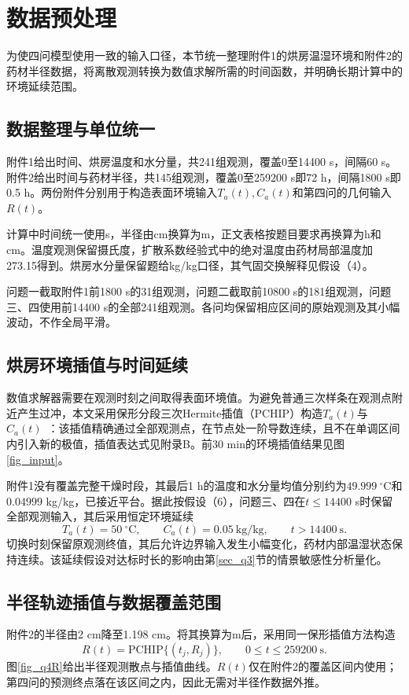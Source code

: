 \section{数据预处理}\label{sec_preprocessing}
为使四问模型使用一致的输入口径，本节统一整理附件1的烘房温湿环境和附件2的药材半径数据，将离散观测转换为数值求解所需的时间函数，并明确长期计算中的环境延续范围。

\subsection{数据整理与单位统一}
附件1给出时间、烘房温度和水分量，共241组观测，覆盖0至14400 s，间隔60 s。附件2给出时间与药材半径，共145组观测，覆盖0至259200 s即72 h，间隔1800 s即0.5 h。两份附件分别用于构造表面环境输入$T_a(t),C_a(t)$和第四问的几何输入$R(t)$。

计算中时间统一使用s，半径由cm换算为m，正文表格按题目要求再换算为h和cm。温度观测保留摄氏度，扩散系数经验式中的绝对温度由药材局部温度加273.15得到。烘房水分量保留题给kg/kg口径，其气固交换解释见假设（4）。

问题一截取附件1前1800 s的31组观测，问题二截取前10800 s的181组观测，问题三、四使用前14400 s的全部241组观测。各问均保留相应区间的原始观测及其小幅波动，不作全局平滑。

\subsection{烘房环境插值与时间延续}
数值求解器需要在观测时刻之间取得表面环境值。为避免普通三次样条在观测点附近产生过冲，本文采用保形分段三次Hermite插值（PCHIP）构造$T_a(t)$与$C_a(t)$~\cite{pchip}：该插值精确通过全部观测点，在节点处一阶导数连续，且不在单调区间内引入新的极值，插值表达式见附录B。前30 min的环境插值结果见图\ref{fig_input}。

附件1没有覆盖完整干燥时段，其最后1 h的温度和水分量均值分别约为$49.999\ ^\circ\mathrm C$和$0.04999$ kg/kg，已接近平台。据此按假设（6），问题三、四在$t\le14400$ s时保留全部观测输入，其后采用恒定环境延续
\begin{equation}\label{eq_late}
T_a(t)=50\ ^\circ\mathrm C,\qquad C_a(t)=0.05\ \mathrm{kg/kg},\qquad t>14400\ \mathrm s.
\end{equation}
切换时刻保留原观测终值，其后允许边界输入发生小幅变化，药材内部温湿状态保持连续。该延续假设对达标时长的影响由第\ref{sec_q3}节的情景敏感性分析量化。

\subsection{半径轨迹插值与数据覆盖范围}
附件2的半径由2 cm降至1.198 cm。将其换算为m后，采用同一保形插值方法构造
\begin{equation}\label{eq_radius_input}
R(t)=\mathrm{PCHIP}\{(t_j,R_j)\},\qquad 0\le t\le259200\ \mathrm s.
\end{equation}
图\ref{fig_q4R}给出半径观测散点与插值曲线。$R(t)$仅在附件2的覆盖区间内使用；第四问的预测终点落在该区间之内，因此无需对半径作数据外推。

\FloatBarrier
